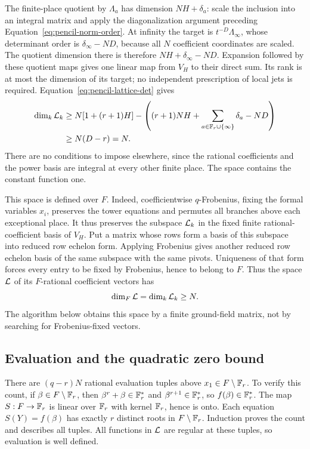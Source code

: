 The finite-place quotient by $\Lambda_a$ has dimension
$NH+\delta_a$: scale the inclusion into an integral matrix and apply
the diagonalization argument preceding
Equation~\ref{eq:pencil-norm-order}.  At infinity the target is
$t^{-D}\Lambda_\infty$, whose determinant order is
$\delta_\infty-ND$, because all $N$ coefficient coordinates are scaled.
The quotient dimension there is therefore
$NH+\delta_\infty-ND$.
Expansion followed by these quotient maps gives one linear map from
$V_H$ to their direct sum.  Its rank is at most the dimension of its
target; no independent prescription of local jets is required.
Equation~\ref{eq:pencil-lattice-det} gives
\begin{align}
 \dim_k\mathcal L_k
 &\geq N[1+(r+1)H]
       -\left((r+1)NH+\sum_{a\in\mathbb F_r\cup\{\infty\}}\delta_a-ND\right)
       \notag\\
 &\geq N(D-r)=N.\label{eq:pencil-dimension}
\end{align}
There are no conditions to impose elsewhere, since the rational
coefficients and the power basis are integral at every other finite
place.  The space contains the constant function one.

This space is defined over $F$.  Indeed, coefficientwise $q$-Frobenius,
fixing the formal variables $x_i$, preserves the tower equations and
permutes all branches above each exceptional place.  It thus preserves
the subspace $\mathcal L_k$ in the fixed finite rational-coefficient basis of
$V_H$.  Put a matrix whose rows form a basis of this subspace into
reduced row echelon form.  Applying Frobenius gives another reduced row
echelon basis of the same subspace with the same pivots.  Uniqueness of
that form forces every entry to be fixed by Frobenius, hence to belong
to $F$.  Thus the space $\mathcal L$ of its $F$-rational coefficient vectors
has
\begin{equation}\label{eq:pencil-descent}
 \dim_F\mathcal L=\dim_k\mathcal L_k\geq N.
\end{equation}
The algorithm below obtains this space by a finite ground-field
matrix, not by searching for Frobenius-fixed vectors.

\subsection{Evaluation and the quadratic zero bound}

There are $(q-r)N$ rational evaluation tuples above
$x_1\in F\setminus\mathbb F_r$.  To verify this count, if
$\beta\in F\setminus\mathbb F_r$, then
$\beta^r+\beta\in\mathbb F_r^*$ and $\beta^{r+1}\in\mathbb F_r^*$, so
$f(\beta)\in\mathbb F_r^*$.  The map $S:F\to\mathbb F_r$ is linear over $\mathbb F_r$
with kernel $\mathbb F_r$, hence is onto.  Each equation
$S(Y)=f(\beta)$ has exactly $r$ distinct roots in
$F\setminus\mathbb F_r$.  Induction proves the count and describes all tuples.
All functions in $\mathcal L$ are regular at these tuples, so evaluation is
well defined.

